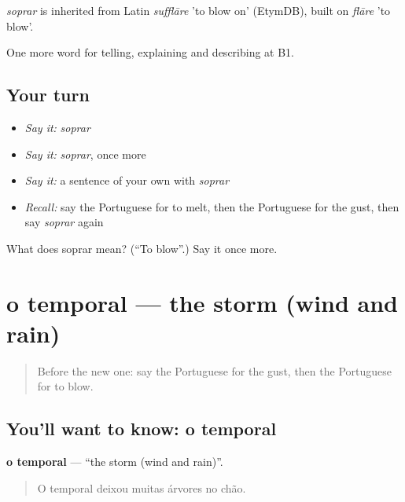 \begin{cousinweb}
\emph{soprar} is inherited from Latin \emph{sufflāre} 'to blow on' (EtymDB), built on \emph{flāre} 'to blow'.
\end{cousinweb}

\begin{grammarlens}[title={What you've built}]
One more word for telling, explaining and describing at B1.
\end{grammarlens}

\subsection*{Your turn}
\begin{itemize}
\raggedright
  \item \emph{Say it:} \emph{soprar}
  \item \emph{Say it:} \emph{soprar}, once more
  \item \emph{Say it:} a sentence of your own with \emph{soprar}
  \item \emph{Recall:} say the Portuguese for to melt, then the Portuguese for the gust, then say \emph{soprar} again
\end{itemize}

\begin{tcolorbox}[breakable,colback=teal!4,colframe=teal!35!black,title={Before you move on}]
What does soprar mean? (\textquotedblleft{}To blow\textquotedblright{}.) Say it once more.
\end{tcolorbox}
\section[o temporal]{o temporal — the storm (wind and rain)}

\label{lesson:PT-C465-temporal}



\begin{quote}
Before the new one: say the Portuguese for the gust, then the Portuguese for to blow.
\end{quote}

\subsection*{You'll want to know: o temporal}
\textbf{o temporal} — \textquotedblleft{}the storm (wind and rain)\textquotedblright{}.

\begin{quote}
O temporal deixou muitas árvores no chão.
\end{quote}

